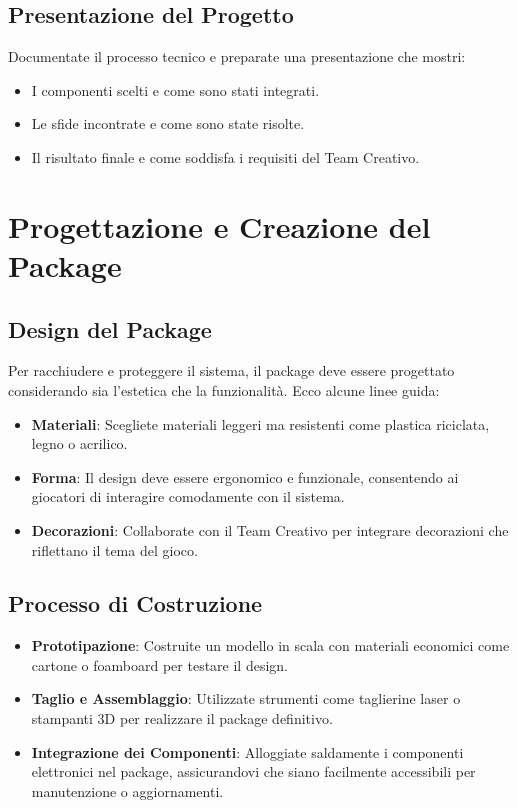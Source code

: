 \documentclass[a4paper,12pt]{report}
\begin{document}
\subsection{Presentazione del Progetto}
Documentate il processo tecnico e preparate una presentazione che mostri:
\begin{itemize}
    \item I componenti scelti e come sono stati integrati.
    \item Le sfide incontrate e come sono state risolte.
    \item Il risultato finale e come soddisfa i requisiti del Team Creativo.
\end{itemize}

\section{Progettazione e Creazione del Package}
\subsection{Design del Package}
Per racchiudere e proteggere il sistema, il package deve essere progettato considerando sia l'estetica che la funzionalit\`a. Ecco alcune linee guida:
\begin{itemize}
    \item \textbf{Materiali}: Scegliete materiali leggeri ma resistenti come plastica riciclata, legno o acrilico.
    \item \textbf{Forma}: Il design deve essere ergonomico e funzionale, consentendo ai giocatori di interagire comodamente con il sistema.
    \item \textbf{Decorazioni}: Collaborate con il Team Creativo per integrare decorazioni che riflettano il tema del gioco.
\end{itemize}

\subsection{Processo di Costruzione}
\begin{itemize}
    \item \textbf{Prototipazione}: Costruite un modello in scala con materiali economici come cartone o foamboard per testare il design.
    \item \textbf{Taglio e Assemblaggio}: Utilizzate strumenti come taglierine laser o stampanti 3D per realizzare il package definitivo.
    \item \textbf{Integrazione dei Componenti}: Alloggiate saldamente i componenti elettronici nel package, assicurandovi che siano facilmente accessibili per manutenzione o aggiornamenti.
\end{itemize}
\end{document}
